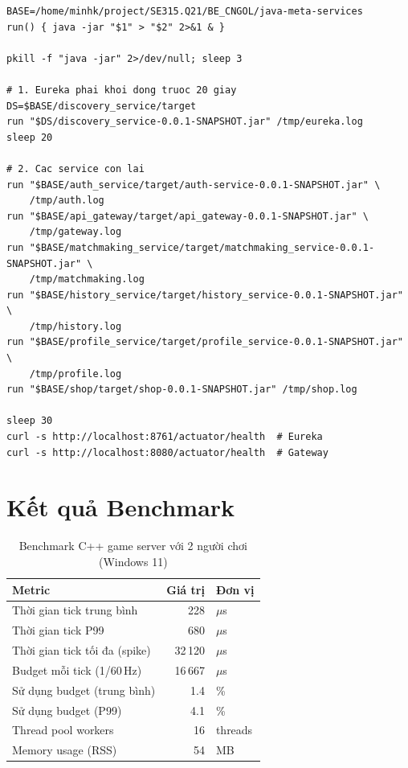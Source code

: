 \documentclass[12pt,a4paper]{report}
\begin{document}
\begin{lstlisting}[style=bashStyle,
  basicstyle=\ttfamily\footnotesize,
  caption={Script khởi động các Java microservices}, label={lst:javastart}]
BASE=/home/minhk/project/SE315.Q21/BE_CNGOL/java-meta-services
run() { java -jar "$1" > "$2" 2>&1 & }

pkill -f "java -jar" 2>/dev/null; sleep 3

# 1. Eureka phai khoi dong truoc 20 giay
DS=$BASE/discovery_service/target
run "$DS/discovery_service-0.0.1-SNAPSHOT.jar" /tmp/eureka.log
sleep 20

# 2. Cac service con lai
run "$BASE/auth_service/target/auth-service-0.0.1-SNAPSHOT.jar" \
    /tmp/auth.log
run "$BASE/api_gateway/target/api_gateway-0.0.1-SNAPSHOT.jar" \
    /tmp/gateway.log
run "$BASE/matchmaking_service/target/matchmaking_service-0.0.1-SNAPSHOT.jar" \
    /tmp/matchmaking.log
run "$BASE/history_service/target/history_service-0.0.1-SNAPSHOT.jar" \
    /tmp/history.log
run "$BASE/profile_service/target/profile_service-0.0.1-SNAPSHOT.jar" \
    /tmp/profile.log
run "$BASE/shop/target/shop-0.0.1-SNAPSHOT.jar" /tmp/shop.log

sleep 30
curl -s http://localhost:8761/actuator/health  # Eureka
curl -s http://localhost:8080/actuator/health  # Gateway
\end{lstlisting}

\section{Kết quả Benchmark}

\begin{table}[H]
\centering
\caption{Benchmark C++ game server với 2 người chơi (Windows 11)}
\label{tab:benchmark}
\begin{tabular}{lrl}
\toprule
\textbf{Metric} & \textbf{Giá trị} & \textbf{Đơn vị} \\
\midrule
Thời gian tick trung bình     & 228     & $\mu$s \\
Thời gian tick P99            & 680     & $\mu$s \\
Thời gian tick tối đa (spike) & 32\,120 & $\mu$s \\
Budget mỗi tick (1/60\,Hz)    & 16\,667 & $\mu$s \\
Sử dụng budget (trung bình)   & 1.4     & \% \\
Sử dụng budget (P99)          & 4.1     & \% \\
Thread pool workers           & 16      & threads \\
Memory usage (RSS)            & 54      & MB \\
\bottomrule
\end{tabular}
\end{table}
\end{document}
